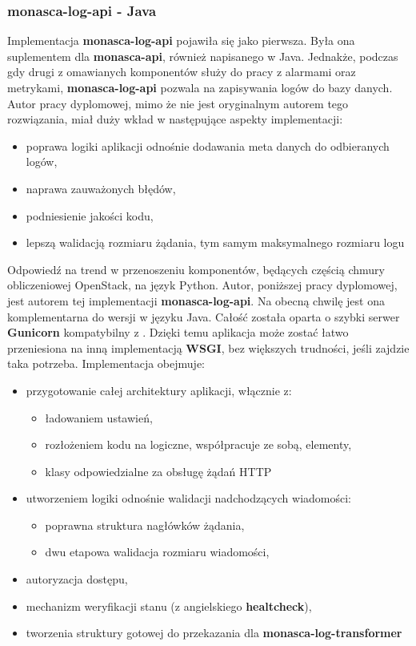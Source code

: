     \subsubsection{monasca-log-api - Java}
    Implementacja \textbf{monasca-log-api} pojawiła się jako pierwsza. Była ona suplementem dla \textbf{monasca-api}, również napisanego w Java.
    Jednakże, podczas gdy drugi z omawianych komponentów służy do pracy z alarmami oraz metrykami, \textbf{monasca-log-api} pozwala na zapisywania
    logów do bazy danych. Autor pracy dyplomowej, mimo że nie jest oryginalnym autorem tego rozwiązania, miał duży wkład w następujące aspekty
    implementacji:
    \begin{itemize}
        \item poprawa logiki aplikacji odnośnie dodawania meta danych do odbieranych logów,
        \item naprawa zauważonych błędów,
        \item podniesienie jakości kodu,
        \item lepszą walidacją rozmiaru żądania, tym samym maksymalnego rozmiaru logu
    \end{itemize}

Odpowiedź na trend w przenoszeniu komponentów, będących częścią chmury obliczeniowej OpenStack, na język Python. Autor, poniższej pracy dyplomowej, jest autorem tej implementacji \textbf{monasca-log-api}. Na obecną chwilę jest ona komplementarna do wersji w języku Java. Całość została oparta o szybki serwer \textbf{Gunicorn} kompatybilny z . Dzięki
temu aplikacja może zostać łatwo przeniesiona na inną implementacją \textbf{WSGI}, bez większych trudności,
jeśli zajdzie taka potrzeba. Implementacja obejmuje:
\begin{itemize}
    \item przygotowanie całej architektury aplikacji, włącznie z:
    \begin{itemize}
        \item ładowaniem ustawień,
        \item rozłożeniem kodu na logiczne, współpracuje ze sobą, elementy,
        \item klasy odpowiedzialne za obsługę żądań HTTP
    \end{itemize}
    \item utworzeniem logiki odnośnie walidacji nadchodzących wiadomości:
    \begin{itemize}
        \item poprawna struktura nagłówków żądania,
        \item dwu etapowa walidacja rozmiaru wiadomości,
    \end{itemize}
    \item autoryzacja dostępu,
    \item mechanizm weryfikacji stanu (z angielskiego \textbf{healtcheck}),
    \item tworzenia struktury gotowej do przekazania dla \textbf{monasca-log-transformer}
\end{itemize}

